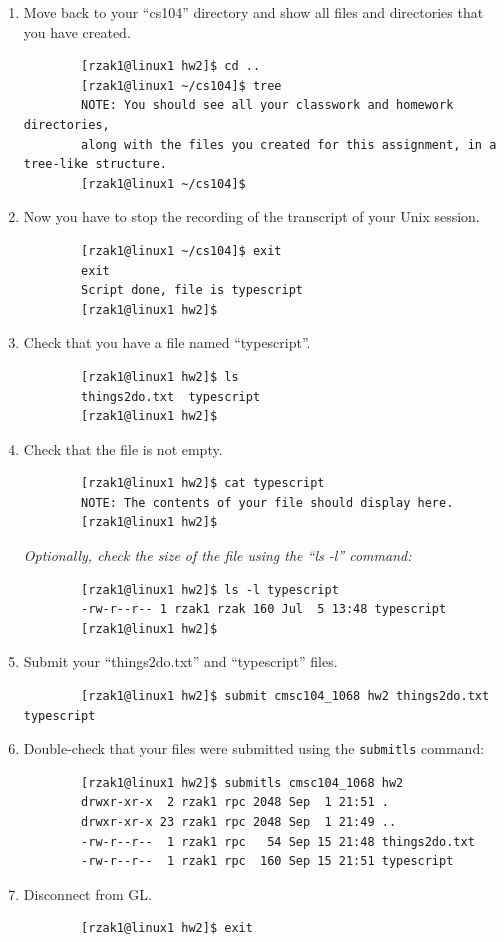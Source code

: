 \documentclass[letter,11pt]{article}
\begin{document}
\begin{enumerate}
    \item Move back to your ``cs104'' directory and show all files and directories that you have created.
    \begin{verbatim}
        [rzak1@linux1 hw2]$ cd ..
        [rzak1@linux1 ~/cs104]$ tree
        NOTE: You should see all your classwork and homework directories, 
        along with the files you created for this assignment, in a tree-like structure.
        [rzak1@linux1 ~/cs104]$\end{verbatim}
    \item Now you have to stop the recording of the transcript of your Unix session.
    \begin{verbatim}
        [rzak1@linux1 ~/cs104]$ exit
        exit
        Script done, file is typescript
        [rzak1@linux1 hw2]$\end{verbatim}
    \item Check that you have a file named ``typescript''.
    \begin{verbatim}
        [rzak1@linux1 hw2]$ ls
        things2do.txt  typescript
        [rzak1@linux1 hw2]$\end{verbatim}
    \item Check that the file is not empty.
    \begin{verbatim}
        [rzak1@linux1 hw2]$ cat typescript
        NOTE: The contents of your file should display here.
        [rzak1@linux1 hw2]$\end{verbatim}
    \textit{Optionally, check the size of the file using the ``ls -l'' command:}
    \begin{verbatim}
        [rzak1@linux1 hw2]$ ls -l typescript
        -rw-r--r-- 1 rzak1 rzak 160 Jul  5 13:48 typescript
        [rzak1@linux1 hw2]$\end{verbatim}
    \item Submit your ``things2do.txt'' and ``typescript'' files.
    \begin{verbatim}
        [rzak1@linux1 hw2]$ submit cmsc104_1068 hw2 things2do.txt typescript\end{verbatim}
    \item Double-check that your files were submitted using the \texttt{submitls} command:
    \begin{verbatim}
        [rzak1@linux1 hw2]$ submitls cmsc104_1068 hw2
        drwxr-xr-x  2 rzak1 rpc 2048 Sep  1 21:51 .
        drwxr-xr-x 23 rzak1 rpc 2048 Sep  1 21:49 ..
        -rw-r--r--  1 rzak1 rpc   54 Sep 15 21:48 things2do.txt
        -rw-r--r--  1 rzak1 rpc  160 Sep 15 21:51 typescript\end{verbatim}
    \item Disconnect from GL.
    \begin{verbatim}
        [rzak1@linux1 hw2]$ exit\end{verbatim}
\end{enumerate}
\end{document}
